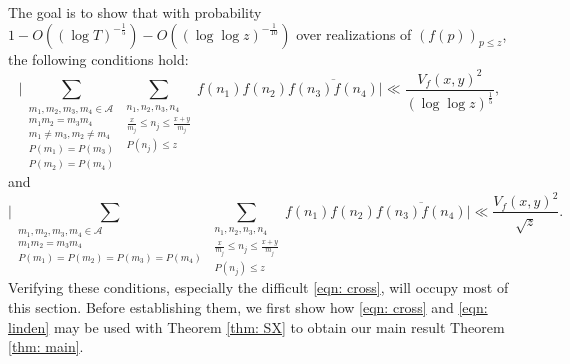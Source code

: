 \documentclass[12pt, notitlepage]{amsart}
\numberwithin{equation}{section}
\def\CA{\mathcal{A}}
\theoremstyle{remark}
\theoremstyle{definition}
\theoremstyle{remark}
\numberwithin{equation}{section}
\begin{document}
The goal is to show that with probability $1- O((\log T)^{-\frac 15}) -O((\log \log z)^{-\frac{1}{10}})$ over realizations of $(f(p))_{p\le z}$, the following 
conditions hold:
\begin{equation}\label{eqn: cross}
 \Big| \sum_{\substack{ m_1, m_2, m_3, m_4 \in \CA \\ m_1 m_2= m_3 m_4 \\ m_1 \neq m_3, m_2\neq m_4 \\ P(m_1)=P(m_3) \\ P(m_2)=P(m_4)}} \sum_{\substack{n_1, n_2, n_3, n_4 \\ \frac{x}{m_j} \le n_j \le \frac{x+y}{m_j} \\ P(n_j)\le z}} f(n_1)f(n_2)\overline{f(n_3) f(n_4)}  \Big| \ll \frac{V_f(x, y)^2}{(\log\log z)^{\frac 15}} ,
\end{equation}
and 
\begin{equation} \label{eqn: linden}
\Big| \sum_{\substack{ m_1, m_2, m_3, m_4 \in \CA \\ m_1 m_2= m_3 m_4  \\ P(m_1)=P(m_2) =P(m_3)=P(m_4)}} \sum_{\substack{n_1, n_2, n_3, n_4 \\ \frac{x}{m_j} \le n_j \le \frac{x+y}{m_j} \\ P(n_j)\le z}} f(n_1)f(n_2)\overline{f(n_3) f(n_4)}  \Big| \ll \frac{V_f(x, y)^2}{\sqrt{z}} .
\end{equation}
Verifying these conditions, especially the difficult \eqref{eqn: cross}, will occupy most of this section.   Before establishing them, we first show how \eqref{eqn: cross} and \eqref{eqn: linden} may be used with Theorem \ref{thm: SX} to obtain our main result Theorem \ref{thm: main}.  
\end{document}
